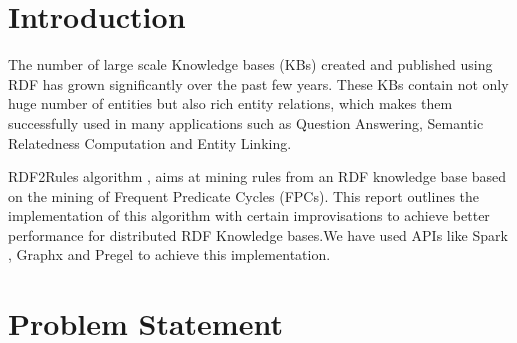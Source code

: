 \documentclass{easychair}
\begin{document}
\setcounter{tocdepth}{2}

%
%

\pagestyle{empty}


\section{Introduction}
\label{sec:intro}
The number of  large scale Knowledge bases (KBs) created and published using RDF has grown significantly over the past few years. These KBs contain not only huge number of entities but also rich entity relations, which makes them successfully used in many applications such as Question Answering, Semantic Relatedness Computation and Entity Linking.

RDF2Rules algorithm \cite{wang2015rdf2rules}, aims at mining rules from an RDF knowledge base based on the mining of Frequent Predicate Cycles (FPCs).  This report outlines the implementation of this algorithm with certain improvisations to achieve better performance for distributed RDF Knowledge bases.We have used APIs like Spark \cite{spark}, Graphx\cite{xin2013graphx} and Pregel\cite{malewicz2010pregel} to achieve this implementation.

 

\section{Problem Statement}
\end{document}
